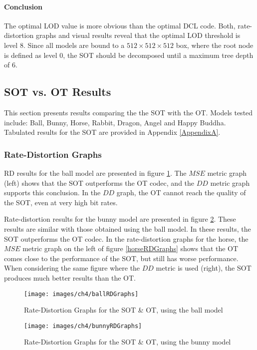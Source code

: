 \paragraph{Conclusion}

The optimal LOD value is more obvious than the optimal DCL code. Both, rate-distortion graphs and visual results reveal that the optimal LOD threshold is level $8$. Since all models are bound to a $512\times 512 \times 512$ box, where the root node is defined as level $0$, the SOT should be decomposed until a maximum tree depth of $6$.

\subsection{SOT vs. OT Results}

This section presents results comparing the the SOT with the OT. Models tested include: Ball, Bunny, Horse, Rabbit, Dragon, Angel and Happy Buddha. Tabulated results for the SOT are provided in Appendix \ref{AppendixA}.

\subsubsection{Rate-Distortion Graphs}

RD results for the ball model are presented in figure \ref{ballRDGraphs}. The $MSE$ metric graph (left) shows that the SOT outperforms the OT codec, and the $DD$ metric graph supports this conclusion. In the $DD$ graph, the OT cannot reach the quality of the SOT, even at very high bit rates.

Rate-distortion results for the bunny model are presented in figure \ref{bunnyRDGraphs}. These results are similar with those obtained using the ball model. In these results, the SOT outperforms the OT codec. In the rate-distortion graphs for the horse, the $MSE$ metric graph on the left of figure \ref{horseRDGraphs} shows that the OT comes close to the performance of the SOT, but still has worse performance. When considering the same figure where the $DD$ metric is used (right), the SOT produces much better results than the OT.

\begin{figure}[!h]
\centering
\texttt{[image: images/ch4/ballRDGraphs]}
\caption{Rate-Distortion Graphs for the SOT \& OT, using the ball model}
\label{ballRDGraphs}
\end{figure}

\begin{figure}[!h]
\centering
\texttt{[image: images/ch4/bunnyRDGraphs]}
\caption{Rate-Distortion Graphs for the SOT \& OT, using the bunny model}
\label{bunnyRDGraphs}
\end{figure}

